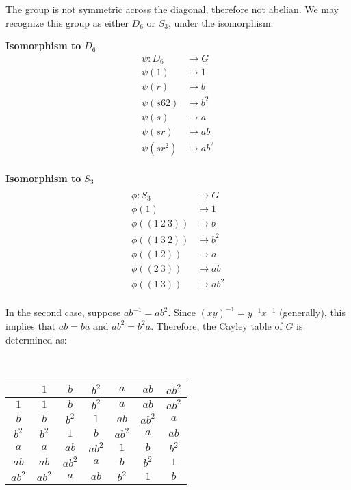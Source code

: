 The group is not symmetric across the diagonal, therefore not abelian.
We may recognize this group as either $D_6$ or $S_3$,
under the isomorphism:
\begin{multicols}{2}
  \textbf{Isomorphism to} $D_6$
  \begin{align*}
    \psi \colon D_6 &\to G \\
    \psi(1) &\mapsto 1 \\
    \psi(r) &\mapsto b \\
    \psi(s62) &\mapsto b^2 \\
    \psi(s) &\mapsto a \\
    \psi(sr) &\mapsto ab \\
    \psi(sr^2) &\mapsto ab^2 \\
  \end{align*}
  \columnbreak

  \textbf{Isomorphism to} $S_3$
  \begin{align*} \\
    \phi \colon S_3 &\to G \\
    \phi(1) &\mapsto 1 \\
    \phi((1\ 2\ 3)) &\mapsto b \\
    \phi((1\ 3\ 2)) &\mapsto b^2 \\
    \phi((1\ 2)) &\mapsto a \\
    \phi((2\ 3)) &\mapsto ab \\
    \phi((1\ 3)) &\mapsto ab^2 \\
  \end{align*}
\end{multicols}
In the second case, suppose ${ab}^{-1} = ab^2$.
Since ${(xy)}^{-1} = y^{-1}x^{-1}$ (generally), this implies that
$ab = ba$ and $ab^2 = b^2a$.
Therefore, the Cayley table of $G$ is determined as:

\begin{center}
  \begin{table}[H]~\label{tab:cayley-table-order-6=b}
    \begin{tabular}{|c|c|c|c|c|c|c|}
      \hline
      & $1$ & $b$ & $b^2$ & $a$ & $ab$ & $ab^2$ \\
      \midrule
      $1$ & $1$ & $b$ & $b^2$ & $a$ & $ab$ & $ab^2$ \\
      $b$ & $b$ & $b^2$ & $1$ & $ab$ & $ab^2$ & $a$ \\
      $b^2$ & $b^2$ & $1$ & $b$ & $ab^2$ & $a$ & $ab$ \\
      $a$ & $a$ & $ab$ & $ab^2$ & $1$ & $b$ & $b^2$ \\
      $ab$ & $ab$ & $ab^2$ & $a$ & $b$ & $b^2$ & $1$ \\
      $ab^2$ & $ab^2$ & $a$ & $ab$ & $b^2$ & $1$ & $b$ \\
      \bottomrule
    \end{tabular}
  \end{table}
\end{center}

